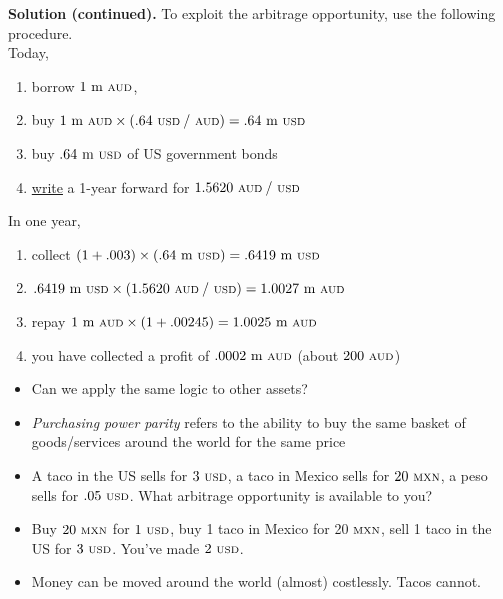 \documentclass{beamer}
\begin{document}
\begin{frame}{}
	\textbf{Solution (continued).} To exploit the arbitrage opportunity, use the following procedure.\\
	\vfill
	Today, 
	\begin{enumerate}
		\item borrow $1\text{ m {\scriptsize AUD}}$, 
		\item buy $1\text{ m {\scriptsize AUD}}\times(.64\text{ {\scriptsize USD}}\:/\text{ {\scriptsize AUD}})=.64\text{ m {\scriptsize USD}}$
		\item buy $.64\text{ m {\scriptsize USD}}$ of US government bonds
		\item \underline{write} a 1-year forward for $1.5620\text{ {\scriptsize AUD}}\:/\text{ {\scriptsize USD}}$
	\end{enumerate}
	In one year, 
	\begin{enumerate}
		\item collect $(1+.003)\times(.64\text{ m {\scriptsize USD}})=.6419\text{ m {\scriptsize USD}}$
		\item $.6419\text{ m {\scriptsize USD}}\times(1.5620\text{ {\scriptsize AUD}}\:/\text{ {\scriptsize USD}})=1.0027\text{ m {\scriptsize AUD}}$
		\item repay $1\text{ m {\scriptsize AUD}}\times(1+.00245)=1.0025\text{ m {\scriptsize AUD}}$ 
		\item you have collected a profit of $.0002\text{ m {\scriptsize AUD}}$ (about $200\text{ {\scriptsize AUD}}$)
	\end{enumerate}
\end{frame}

\begin{frame}{}
	\begin{itemize}
		\item Can we apply the same logic to other assets?
		\item \textit{Purchasing power parity} refers to the ability to buy the same basket of goods/services around the world for the same price
        \item A taco in the US sells for $3\text{ {\scriptsize USD}}$, a taco in Mexico sells for $20\text{ {\scriptsize MXN}}$, a peso sells for $.05\text{ {\scriptsize USD}}$. What arbitrage opportunity is available to you?
        \item Buy $20\text{ {\scriptsize MXN}}$ for $1\text{ {\scriptsize USD}}$, buy 1 taco in Mexico for 20$\text{ {\scriptsize MXN}}$, sell 1 taco in the US for $3\text{ {\scriptsize USD}}$. You've made $2\text{ {\scriptsize USD}}$.
		\item Money can be moved around the world (almost) costlessly. Tacos cannot.
    \end{itemize}
\end{frame}
\end{document}
